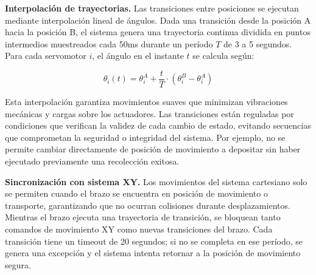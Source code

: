 \textbf{Interpolación de trayectorias.} Las transiciones entre posiciones se ejecutan mediante interpolación lineal de ángulos. Dada una transición desde la posición A hacia la posición B, el sistema genera una trayectoria continua dividida en puntos intermedios muestreados cada 50ms durante un período $T$ de 3 a 5 segundos. Para cada servomotor $i$, el ángulo en el instante $t$ se calcula según:

\begin{equation}
\theta_i(t) = \theta_i^A + \frac{t}{T} \cdot (\theta_i^B - \theta_i^A)
\end{equation}

Esta interpolación garantiza movimientos suaves que minimizan vibraciones mecánicas y cargas sobre los actuadores. Las transiciones están reguladas por condiciones que verifican la validez de cada cambio de estado, evitando secuencias que comprometan la seguridad o integridad del sistema. Por ejemplo, no se permite cambiar directamente de posición de movimiento a depositar sin haber ejecutado previamente una recolección exitosa.

\textbf{Sincronización con sistema XY.} Los movimientos del sistema cartesiano solo se permiten cuando el brazo se encuentra en posición de movimiento o transporte, garantizando que no ocurran colisiones durante desplazamientos. Mientras el brazo ejecuta una trayectoria de transición, se bloquean tanto comandos de movimiento XY como nuevas transiciones del brazo. Cada transición tiene un timeout de 20 segundos; si no se completa en ese período, se genera una excepción y el sistema intenta retornar a la posición de movimiento segura.
